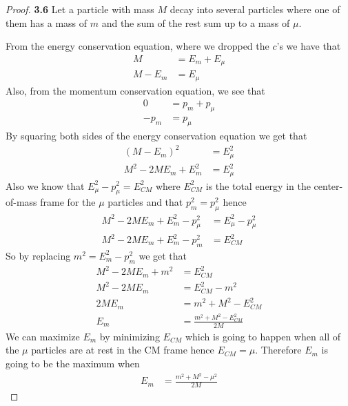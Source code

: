 \documentclass[11pt]{article}
\theoremstyle{definition}
\begin{document}
\begin{proof}{\textbf{3.6}}
    Let a particle with mass $M$ decay into several particles where one of
    them has a mass of $m$ and the sum of the rest sum up to a mass of $\mu$.

    From the energy conservation equation, where we dropped the $c$'s we have
    that
    \begin{align*}
        M &= E_m + E_\mu\\
        M - E_m &= E_\mu
    \end{align*}
    Also, from the momentum conservation equation, we see that
    \begin{align*}
        0 &= p_m + p_\mu\\
        -p_m &= p_\mu
    \end{align*}
    By squaring both sides of the energy conservation equation we get that
    \begin{align*}
        (M - E_m)^2 &= E_\mu^2\\
        M^2 - 2ME_m + E_m^2 &= E_\mu^2
    \end{align*}
    Also we know that $E_\mu^2 -p_\mu^2 = E_{CM}^2$ where $E_{CM}^2$ is the
    total energy in the center-of-mass frame for the $\mu$ particles and that
    $p_m^2 = p_\mu^2$ hence
    \begin{align*}
        M^2 - 2ME_m + E_m^2 -p_\mu^2 &= E_\mu^2 -p_\mu^2\\
        M^2 - 2ME_m + E_m^2 -p_m^2 &= E_{CM}^2
    \end{align*}
    So by replacing $m^2 = E_m^2 - p_m^2$ we get that
    \begin{align*}
        M^2 - 2ME_m + m^2 &= E_{CM}^2\\
        M^2 - 2ME_m  &= E_{CM}^2  - m^2\\
        2ME_m  &= m^2 + M^2 - E_{CM}^2\\
        E_m &= \frac{m^2 + M^2 - E_{CM}^2}{2M}
    \end{align*}
    We can maximize $E_m$ by minimizing $E_{CM}$ which is going to happen
    when all of the $\mu$ particles are at rest in the CM frame hence
    $E_{CM} = \mu$. Therefore $E_m$ is going to be the maximum when
    \begin{align*}
        E_m &= \frac{m^2 + M^2 - \mu^2}{2M}        
    \end{align*}
\end{proof}
\cleardoublepage
\end{document}
